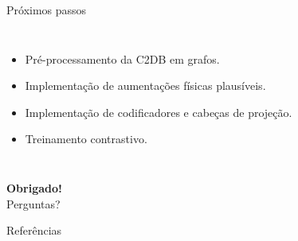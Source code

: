 \documentclass[aspectratio=169,10pt]{beamer}
\newcommand{\tightitem}{\setlength{\itemsep}{3pt}\setlength{\parskip}{0pt}}
\begin{document}
\begin{frame}{Próximos passos}
\begin{columns}[T,onlytextwidth]
  \begin{itemize}\tightitem
    \item Pré-processamento da C2DB em grafos.
    \item Implementação de aumentações físicas plausíveis.
    \item Implementação de codificadores e cabeças de projeção.
    \item Treinamento contrastivo.
  \end{itemize}
\end{columns}
    \vfill
  \centering
  {\Large\bfseries\color{ResearchGreenDark}Obrigado!}\\[2mm]
  Perguntas?
\end{frame}

\begin{frame}{Referências}
  \begin{columns}
  \tiny
  
  
  \end{columns}
\end{frame}
\end{document}
